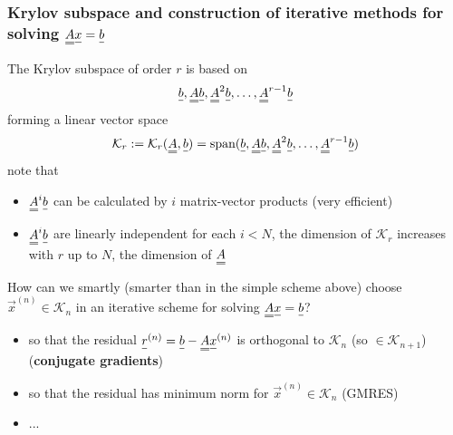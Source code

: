 \subsubsection{Krylov subspace and construction of iterative methods for solving $\mat{A}\vec{x} = \vec{b}$}
The Krylov subspace of order $r$ is based on
\begin{equation}
    \vec{b}, \mat{A}\vec{b}, \mat{A}^2\vec{b}, \dots, \mat{A}^{r-1}\vec{b}
\end{equation}
forming a linear vector space
\begin{equation}
    \mathcal{K}_r := \mathcal{K}_r(\mat{A},\vec{b}) = \text{span} {(\vec{b}, \mat{A}\vec{b}, \mat{A}^2\vec{b}, \dots, \mat{A}^{r-1}\vec{b})}
\end{equation}
note that
\begin{itemize}
    \item $\mat{A}^i \vec{b}$ can be calculated by $i$ matrix-vector products (very efficient)
    \item $\mat{A}^i \vec{b}$ are linearly independent for each $i < N$, the dimension of $\mathcal{K}_r$ increases with $r$ up to $N$, the dimension of $\mat{A}$
\end{itemize}
How can we smartly (smarter than in the simple scheme above) choose $\vec{x}^{(n)} \in \mathcal{K}_n$ in an iterative scheme for solving $\mat{A}\vec{x} = \vec{b}$?
\begin{itemize}
    \item so that the residual $\vec{r}^{(n)} = \vec{b} - \mat{A}\vec{x}^{(n)}$ is orthogonal to $\mathcal{K}_n$ (so $\in \mathcal{K}_{n+1}$) (\textbf{conjugate gradients})
    \item so that the residual has minimum norm for $\vec{x}^{(n)} \in \mathcal{K}_n$ (GMRES)
    \item ...
\end{itemize}

